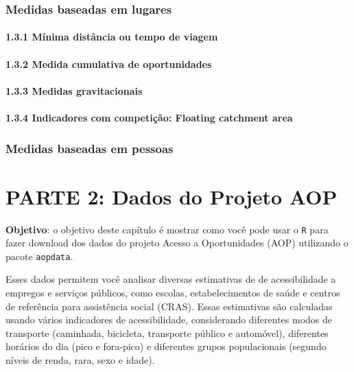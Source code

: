 \documentclass[
  letterpaper,
  DIV=11,
  numbers=noendperiod]{scrreprt}
\begin{document}
\hypertarget{medidas-baseadas-em-lugares}{%
\section{Medidas baseadas em
lugares}\label{medidas-baseadas-em-lugares}}

\hypertarget{muxednima-distuxe2ncia-ou-tempo-de-viagem}{%
\subsection{1.3.1 Mínima distância ou tempo de
viagem}\label{muxednima-distuxe2ncia-ou-tempo-de-viagem}}

\hypertarget{medida-cumulativa-de-oportunidades}{%
\subsection{1.3.2 Medida cumulativa de
oportunidades}\label{medida-cumulativa-de-oportunidades}}

\hypertarget{medidas-gravitacionais}{%
\subsection{1.3.3 Medidas gravitacionais}\label{medidas-gravitacionais}}

\hypertarget{indicadores-com-competiuxe7uxe3o-floating-catchment-area}{%
\subsection{1.3.4 Indicadores com competição: Floating catchment
area}\label{indicadores-com-competiuxe7uxe3o-floating-catchment-area}}

\hypertarget{medidas-baseadas-em-pessoas}{%
\section{Medidas baseadas em
pessoas}\label{medidas-baseadas-em-pessoas}}

\part{PARTE 2: Dados do Projeto AOP}

\textbf{Objetivo}: o objetivo deste capítulo é mostrar como você pode
usar o \texttt{R} para fazer download dos dados do projeto Acesso a
Oportunidades (AOP) utilizando o pacote \texttt{aopdata}.

Esses dados permitem você analisar diversas estimativas de de
acessibilidade a empregos e serviços públicos, como escolas,
estabelecimentos de saúde e centros de referência para assistência
social (CRAS). Essas estimativas são calculadas usando vários
indicadores de acessibilidade, considerando diferentes modos de
transporte (caminhada, bicicleta, transporte público e automóvel),
diferentes horários do dia (pico e fora-pico) e diferentes grupos
populacionais (segundo níveis de renda, rara, sexo e idade).
\end{document}
